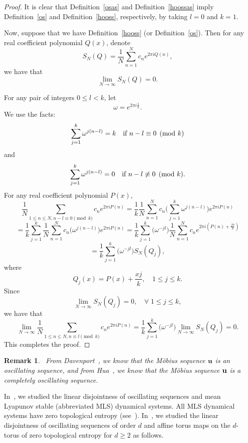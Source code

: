 \documentclass[12pt,letterpaper]{amsart}
\newtheorem{remark}{Remark}
\begin{document}
 \begin{proof}
It is clear that Definition~\ref{osas} and Definition~\ref{hoossas} imply Definition~\ref{os} and Definition~\ref{hooss}, respectively,  by taking $l=0$ and $k=1$.

Now, suppose that we have Definition~\ref{hooss} (or Definition~\ref{os}). Then for any real coefficient polynomial 
$Q(x)$, denote 
$$
S_{N}(Q) =\frac{1}{N} \sum_{n=1}^{N} c_{n} e^{2\pi i Q(n)},
$$
we have that 
$$
\lim_{N\to \infty} S_{N}(Q) =0.
$$

For any pair of integers $0\leq l<k$, let 
$$
\omega =e^{2\pi i \frac{1}{k}}.
$$
We use the facts:
$$
 \sum_{j=1}^{k} \omega^{j(n-l)}=k \quad \hbox{if $n-l \equiv 0 \pmod{k}$}
 $$
 and
 $$
 \sum_{j=1}^{k} \omega^{j(n-l)}=0 \quad \hbox{if $n-l \not\equiv 0 \pmod{k}$}.  
 $$
For any real coefficient polynomial $P(x)$, 
$$
\frac{1}{N} \sum_{1\leq n\leq N, n-l \equiv 0 \pmod{k}} c_{n} e^{2\pi i P(n)}=\frac{1}{k}
\frac{1}{N} \sum_{n=1}^{N} c_{n} \Big( \sum_{j=1}^{k} \omega^{j(n-l)}\Big) e^{2\pi i P(n)} 
$$
$$
=\frac{1}{k}\sum_{j=1}^{k} \frac{1}{N}\sum_{n=1}^{N} c_{n} \Big( \omega^{j(n-l)}\Big) e^{2\pi i P(n)}
=\frac{1}{k}\sum_{j=1}^{k}  \Big(\omega^{-jl}\Big) \frac{1}{N}\sum_{n=1}^{N} c_{n} e^{2\pi i (P(n)+\frac{jn}{k})} 
$$
$$
=\frac{1}{k} \sum_{j=1}^{k} \Big( \omega^{-jl}\Big)  S_{N}(Q_{j}),
$$
where 
$$
Q_{j} (x) =P(x) +\frac{xj}{k}, \quad 1\leq j\leq k.
$$
Since 
$$
\lim_{N\to \infty} S_{N}(Q_{j}) =0, \quad \forall\; 1\leq j\leq k,
$$
we have that 
$$
\lim_{N\to \infty} \frac{1}{N} 
\sum_{1\leq n\leq N, n\equiv l \pmod{k}} c_{n} e^{2\pi i P(n)}=
\frac{1}{k} \sum_{j=1}^{k} \Big( \omega^{-jl}\Big) \lim_{N\to \infty} S_{N}(Q_{j}) 
=0.
$$
This completes the proof.
 \end{proof}

\medskip
\begin{remark}~\label{mf}
From Davenport~\cite{Da}, we know that the M\"obius sequence ${\bf u}$ is an oscillating sequence, and from Hua~\cite{Hua}, we know that the M\"obius sequence ${\bf u}$ is a completely oscillating sequence. 
\end{remark}

In~\cite{FJ}, we studied the linear disjointness of oscillating sequences and mean Lyapunov stable (abbreviated MLS) dynamical systems. All MLS dynamical systems have zero topological entropy (see~\cite{LTY}).  In~\cite{JPAMS}, we studied the linear disjointness of oscillating sequences of order $d$ and affine torus maps on the $d$-torus of zero topological entropy for $d\geq 2$ as follows. 
\end{document}
